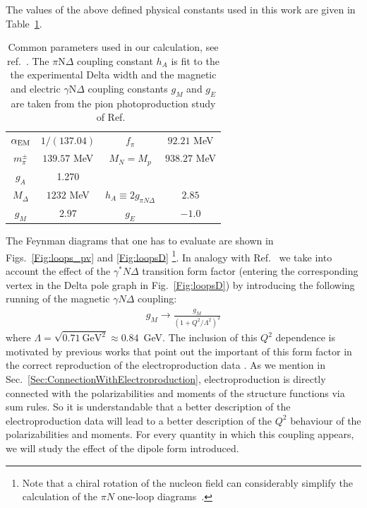 \documentclass[prc,twocolumn,showpacs,preprintnumbers,amsmath,amssymb
,superscriptaddress,a4paper,nofootinbib
]{revtex4-1}
\begin{document}
The values of the above defined physical constants used in this work are given in Table~\ref{tab:constants}.

\begin{table}[hbt]
\begin{tabular}{|c|c||c|c|}
\hline
$\alpha_{\rm EM}$ & $1/(137.04)$&
$f_\pi$ & $92.21$ MeV \\
$m_\pi^{\pm}$ & $139.57$ MeV &
$M_N=M_p$ & $938.27$ MeV\\
$g_A$ & 1.270 &
&  \\
$M_\Delta$ & $1232$ MeV&
$h_A\equiv 2g_{\pi N \Delta}$& $2.85$\\
$g_M$ & $2.97$ & $g_E$ & $-1.0$\\
\hline
\end{tabular}
\caption{Common parameters used in our calculation, see ref.~\cite{Agashe:2014kda}.
The $\pi$N$\Delta$ coupling constant $h_A$ is fit to the the experimental Delta width and the magnetic and electric $\gamma$N$\Delta$ coupling constants $g_M$ and $g_E$
are taken from the pion photoproduction study of Ref.~\cite{Pascalutsa:2005vq}}
\label{tab:constants}
\end{table}
The Feynman diagrams that one has to evaluate are shown in Figs.~\ref{Fig:loops_pv} and \ref{Fig:loopsD}
\footnote{Note that a chiral rotation of the nucleon field can considerably simplify the calculation of the $\pi N$ one-loop diagrams~\cite{Lensky:2009uv}.}.
 In analogy with Ref.~\cite{Pascalutsa:2005vq} we take into account the effect of the $\gamma^* N \Delta$ transition form factor
(entering the corresponding vertex in the Delta pole graph in Fig.~\ref{Fig:loopsD}) by introducing the following running
of the magnetic $\gamma N\Delta$ coupling:
\begin{align}
g_M \to \frac{g_M}{(1+ Q^2/\Lambda^2 )^2 }
\end{align} 
where $\Lambda=\sqrt{0.71~\text{GeV}^2}\approx 0.84$~GeV. 
The inclusion of this $Q^2$ dependence is motivated by previous works that point out the important of this form factor in the correct reproduction of the electroproduction data \cite{Pascalutsa:2005vq}. 
As we mention in Sec.~\ref{Sec:ConnectionWithElectroproduction}, electroproduction is directly connected with the polarizabilities and moments of the structure functions via sum rules. 
 So it is understandable that a better description of the electroproduction data will lead to a better description of the $Q^2$ behaviour of the polarizabilities and moments.
  For every quantity in which this coupling appears, we will study the effect of the dipole form introduced. 
 
\end{document}
